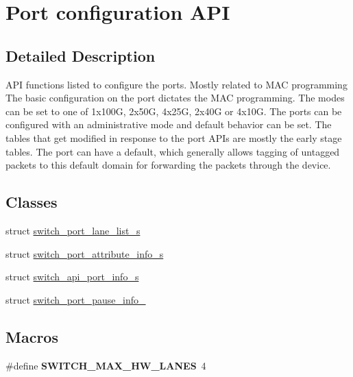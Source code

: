\hypertarget{group__Port}{\section{Port configuration A\+P\+I}
\label{group__Port}
}


\subsection{Detailed Description}
A\+P\+I functions listed to configure the ports. Mostly related to M\+A\+C programming The basic configuration on the port dictates the M\+A\+C programming. The modes can be set to one of 1x100\+G, 2x50\+G, 4x25\+G, 2x40\+G or 4x10\+G. The ports can be configured with an administrative mode and default behavior can be set. The tables that get modified in response to the port A\+P\+Is are mostly the early stage tables. The port can have a default, which generally allows tagging of untagged packets to this default domain for forwarding the packets through the device. \subsection*{Classes}
\begin{DoxyCompactItemize}
\item 
struct \hyperlink{structswitch__port__lane__list__s}{switch\+\_\+port\+\_\+lane\+\_\+list\+\_\+s}
\item 
struct \hyperlink{structswitch__port__attribute__info__s}{switch\+\_\+port\+\_\+attribute\+\_\+info\+\_\+s}
\item 
struct \hyperlink{structswitch__api__port__info__s}{switch\+\_\+api\+\_\+port\+\_\+info\+\_\+s}
\item 
struct \hyperlink{structswitch__port__pause__info__}{switch\+\_\+port\+\_\+pause\+\_\+info\+\_\+}
\end{DoxyCompactItemize}
\subsection*{Macros}
\begin{DoxyCompactItemize}
\item 
\hypertarget{group__Port_ga271f979a046c4ea8be47e95635a1079b}{\#define {\bfseries S\+W\+I\+T\+C\+H\+\_\+\+M\+A\+X\+\_\+\+H\+W\+\_\+\+L\+A\+N\+E\+S}~4}\label{group__Port_ga271f979a046c4ea8be47e95635a1079b}

\end{DoxyCompactItemize}
